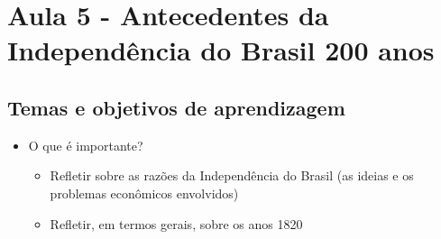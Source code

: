 \documentclass[a4paper,12pt]{article}[abntex2]
\begin{document}
\section{\textbf{Aula 5 - Antecedentes da Independência do Brasil 200 anos}}

\subsection{\textbf{Temas e objetivos de aprendizagem}}
\begin{itemize}
    \item O que é importante?
    \begin{itemize}
        \item Refletir sobre as razões da Independência do Brasil (as ideias e os
problemas econômicos envolvidos)
\item Refletir, em termos gerais, sobre os anos 1820
    \end{itemize}
\end{itemize}
\end{document}
